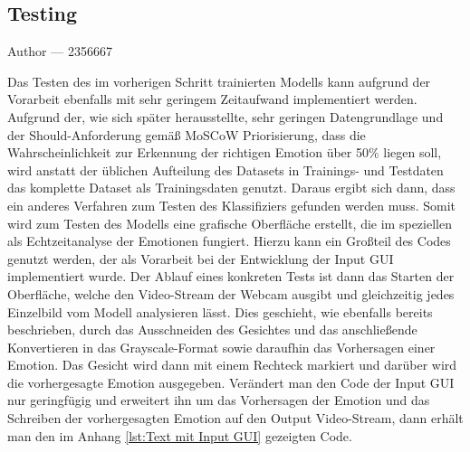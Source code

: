 \documentclass[12pt, a4paper]{report}
\makeatletter
\newcommand{\sectionauthor}[1]{%
  {\parindent0pt\vspace*{-5pt}%
  \large{Author --- }
  \linespread{1.1}\large\scshape#1%
  \par\nobreak\vspace*{35pt} }
  \@afterheading%
}
\makeatother
\begin{document}
\subsection{Testing}
\sectionauthor{2356667}
Das Testen des im vorherigen Schritt trainierten Modells kann aufgrund der Vorarbeit ebenfalls mit sehr geringem Zeitaufwand implementiert werden. Aufgrund der, wie sich später herausstellte, sehr geringen Datengrundlage und der Should-Anforderung gemäß MoSCoW Priorisierung, dass die Wahrscheinlichkeit zur Erkennung der richtigen Emotion über 50\% liegen soll, wird anstatt der üblichen Aufteilung des Datasets in Trainings- und Testdaten das komplette Dataset als Trainingsdaten genutzt. Daraus ergibt sich dann, dass ein anderes Verfahren zum Testen des Klassifiziers gefunden werden muss. Somit wird zum Testen des Modells eine grafische Oberfläche erstellt, die im speziellen als Echtzeitanalyse der Emotionen fungiert. Hierzu kann ein Großteil des Codes genutzt werden, der als Vorarbeit bei der Entwicklung der Input GUI implementiert wurde. Der Ablauf eines konkreten Tests ist dann das Starten der Oberfläche, welche den Video-Stream der Webcam ausgibt und gleichzeitig jedes Einzelbild vom Modell analysieren lässt. Dies geschieht, wie ebenfalls bereits beschrieben, durch das Ausschneiden des Gesichtes und das anschließende Konvertieren in das Grayscale-Format sowie daraufhin das Vorhersagen einer Emotion. Das Gesicht wird dann mit einem Rechteck markiert und darüber wird die vorhergesagte Emotion ausgegeben. Verändert man den Code der Input GUI nur geringfügig und erweitert ihn um das Vorhersagen der Emotion und das Schreiben der vorhergesagten Emotion auf den Output Video-Stream, dann erhält man den im Anhang \ref{lst:Text mit Input GUI} gezeigten Code.
\end{document}
